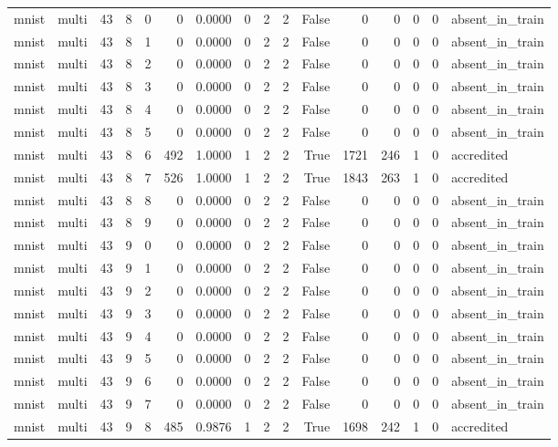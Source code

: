 \begin{tabular}{llrrrrrrrrrrrrrl}
mnist & multi & 43 & 8 & 0 & 0 & 0.0000 & 0 & 2 & 2 & False & 0 & 0 & 0 & 0 & absent\_in\_train \\
mnist & multi & 43 & 8 & 1 & 0 & 0.0000 & 0 & 2 & 2 & False & 0 & 0 & 0 & 0 & absent\_in\_train \\
mnist & multi & 43 & 8 & 2 & 0 & 0.0000 & 0 & 2 & 2 & False & 0 & 0 & 0 & 0 & absent\_in\_train \\
mnist & multi & 43 & 8 & 3 & 0 & 0.0000 & 0 & 2 & 2 & False & 0 & 0 & 0 & 0 & absent\_in\_train \\
mnist & multi & 43 & 8 & 4 & 0 & 0.0000 & 0 & 2 & 2 & False & 0 & 0 & 0 & 0 & absent\_in\_train \\
mnist & multi & 43 & 8 & 5 & 0 & 0.0000 & 0 & 2 & 2 & False & 0 & 0 & 0 & 0 & absent\_in\_train \\
mnist & multi & 43 & 8 & 6 & 492 & 1.0000 & 1 & 2 & 2 & True & 1721 & 246 & 1 & 0 & accredited \\
mnist & multi & 43 & 8 & 7 & 526 & 1.0000 & 1 & 2 & 2 & True & 1843 & 263 & 1 & 0 & accredited \\
mnist & multi & 43 & 8 & 8 & 0 & 0.0000 & 0 & 2 & 2 & False & 0 & 0 & 0 & 0 & absent\_in\_train \\
mnist & multi & 43 & 8 & 9 & 0 & 0.0000 & 0 & 2 & 2 & False & 0 & 0 & 0 & 0 & absent\_in\_train \\
mnist & multi & 43 & 9 & 0 & 0 & 0.0000 & 0 & 2 & 2 & False & 0 & 0 & 0 & 0 & absent\_in\_train \\
mnist & multi & 43 & 9 & 1 & 0 & 0.0000 & 0 & 2 & 2 & False & 0 & 0 & 0 & 0 & absent\_in\_train \\
mnist & multi & 43 & 9 & 2 & 0 & 0.0000 & 0 & 2 & 2 & False & 0 & 0 & 0 & 0 & absent\_in\_train \\
mnist & multi & 43 & 9 & 3 & 0 & 0.0000 & 0 & 2 & 2 & False & 0 & 0 & 0 & 0 & absent\_in\_train \\
mnist & multi & 43 & 9 & 4 & 0 & 0.0000 & 0 & 2 & 2 & False & 0 & 0 & 0 & 0 & absent\_in\_train \\
mnist & multi & 43 & 9 & 5 & 0 & 0.0000 & 0 & 2 & 2 & False & 0 & 0 & 0 & 0 & absent\_in\_train \\
mnist & multi & 43 & 9 & 6 & 0 & 0.0000 & 0 & 2 & 2 & False & 0 & 0 & 0 & 0 & absent\_in\_train \\
mnist & multi & 43 & 9 & 7 & 0 & 0.0000 & 0 & 2 & 2 & False & 0 & 0 & 0 & 0 & absent\_in\_train \\
mnist & multi & 43 & 9 & 8 & 485 & 0.9876 & 1 & 2 & 2 & True & 1698 & 242 & 1 & 0 & accredited \\

\end{tabular}
